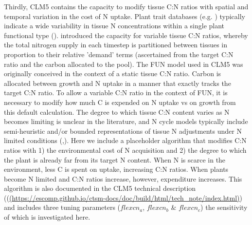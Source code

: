 \usepackage{}\documentclass[draft,linenumbers]{agujournal}
\begin{document}
Thirdly, CLM5 contains the capacity to modify tissue C:N ratios with spatial and temporal variation in the cost of N uptake.  Plant trait databases (e.g. \cite{kattge2011}) typically indicate a wide variability in tissue N concentrations within a single plant functional type (\cite{wright2005}). \cite{ghimire2016} introduced the capacity for variable tissue C:N ratios, whereby the total nitrogen supply in each timestep is partitioned between tissues in proportion to their relative 'demand' terms (ascertained from the target C:N ratio and the carbon allocated to the pool).  The FUN model used in CLM5 was originally conceived in the context of a static tissue C:N ratio. Carbon is allocated between growth and N uptake in a manner that exactly tracks the target C:N ratio. To allow a variable C:N ratio in the context of FUN, it is necessary to modify how much C is expended on N uptake vs on growth from this default calculation. The degree to which tissue C:N content varies as N becomes limiting is unclear in the literature, and N cycle models typically include semi-heuristic and/or bounded representations of tissue N adjustments under N limited conditions (\cite{zaehle2010},\cite{ghimire2016}). Here we include a placeholder algorithm that modifies C:N ratios with 1) the environmental cost of N acquisition and 2) the degree to which the plant is already far from its target N content. When N is scarce in the environment, less C is spent on uptake, increasing C:N ratios. When plants become N limited and C:N ratios increase, however, expenditure increases. This algorithm is also documented in the CLM5 technical description ((\url{(https://escomp.github.io/ctsm-docs/doc/build/html/tech_note/index.html)}) and includes three tuning parameters ($flexcn_{a}$, $flexcn_{b}$ \& $flexcn_{c}$) the sensitivity of which is investigated here.
\end{document}
